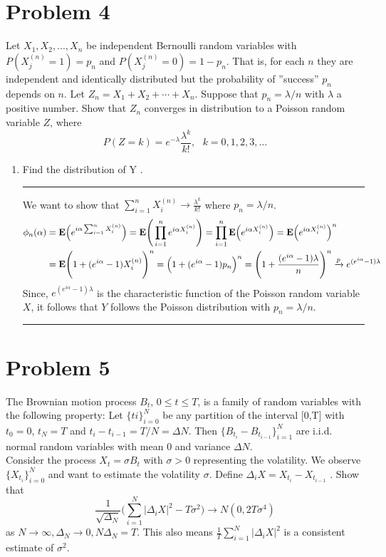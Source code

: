 \documentclass{article} %
\newcommand{\E}{{\mbox {\bf E}}}
\begin{document}
\section*{Problem 4}
Let $X_1 ,X_2 ,...,X_n$ be independent Bernoulli random variables with $P(X_j^{(n)} = 1) = p_n$ and $P(X_j^{(n)} = 0) = 1-p_n$. That is, for each $n$ they are independent and identically distributed but the probability of ''success'' $p_n$ depends on $n$. Let $Z_n = X_1 +X_2 +\cdots+X_n$. Suppose that $p_n = \lambda/n$ with $\lambda$ a positive number. Show that $Z_n$ converges in distribution to a Poisson random variable $Z$, where
\[ P(Z=k) = e^{-\lambda} \frac{\lambda^k}{k!}, \ \ \ k = 0,1,2,3, \dotsc\]
\begin{enumerate}
\item Find the distribution of Y .

\rule{\textwidth}{1pt}
We want to show that $\sum_{i=1}^n X_i^{(n)} \to \frac{\lambda^k}{k!}$ where $p_n = \lambda/n$.
\begin{align*}
\phi_n(\alpha) &= \E\Big( e^{i\alpha \sum_{i=1}^n X_i^{(n)}}  \Big) = \E\Bigg( \prod_{i=1}^ne^{i\alpha X_i^{(n)}}  \Bigg) = \prod_{i=1}^n\E\Big(e^{i\alpha X_i^{(n)}}  \Big) = \E\Big(e^{i\alpha X_i^{(n)}}  \Big)^n \\
&= \E\Bigg( 1+ (e^{i\alpha}-1) X_i^{(n)}  \Bigg)^n =  \Big( 1+ (e^{i\alpha}-1) p_n  \Big)^n= \Bigg( 1+ \frac{(e^{i\alpha}-1) \lambda}{n}  \Bigg)^n \xrightarrow[]{p} e^{(e^{i\alpha}-1)\lambda}
\end{align*}
Since, $e^{(e^{i\alpha}-1)\lambda}$ is the characteristic function of the Poisson random variable $X$, it follows that $Y$ follows the Poisson distribution with $p_n = \lambda/n$.

\rule{\textwidth}{1pt}
\end{enumerate}





\section*{Problem 5}
The Brownian motion process $B_t$, $0 \le t \le T$, is a family of random variables with the following property: Let $\{ti\}_{i=0}^N$ be any partition of the interval [0,T] with $t_0 = 0$, $t_N = T$ and $t_i - t_{i-1} = T/N = \Delta N$. Then $\{B_{t_i} - B_{t_{i-1}} \}_{i=1}^N$ are i.i.d. normal random variables with mean 0 and variance $\Delta N$. \\
Consider the process $X_t = \sigma B_t$ with $\sigma > 0$ representing the volatility. We observe $\{X_{t_i} \}^N_{i=0}$ and want to estimate the volatility $\sigma$. Define $\Delta_iX = X_{t_i} - X_{t_{i-1}}$ . Show that
\[ \frac{1}{\sqrt{\Delta_N}} \Bigg(\sum_{i=1}^N |\Delta_iX|^2-T\sigma^2  \Bigg) \to N(0, 2T\sigma^4) \]
as $N\to\infty, \Delta_N\to0, N\Delta_N=T$. This also means $\frac{1}{T}\sum_{i=1}^N |\Delta_iX|^2$ is a consistent estimate of $\sigma^2$. 
\end{document}
